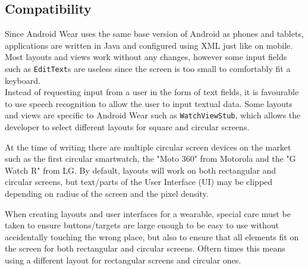 \subsection{Compatibility}
Since Android Wear uses the same base version of Android as phones and tablets,
applications are written in Java and configured using XML just like on mobile.
Most layouts and views work without any changes, however some input fields such
as \texttt{EditText}s are useless since the screen is too small to comfortably
fit a keyboard.\\
Instead of requesting input from a user in the form of text fields, it is
favourable to use speech recognition to allow the user to input textual data.
Some layouts and views are specific to Android Wear such as
\texttt{WatchViewStub}, which allows the developer to select different layouts
for square and circular screens.

At the time of writing there are multiple circular screen devices on the market
such as the first circular smartwatch, the "Moto 360" from Motorola and the "G
Watch R" from LG. By default, layouts will work on both rectangular and
circular screens, but text/parts of the User Interface (UI) may be clipped
depending on radius of the screen and the pixel density.

When creating layouts and user interfaces for a wearable, special care must be
taken to ensure buttons/targets are large enough to be easy to use without
accidentally touching the wrong place, but also to ensure that all elements fit
on the screen for both rectangular and circular screens. Oftern times this means
using a different layout for rectangular screens and circular ones.

